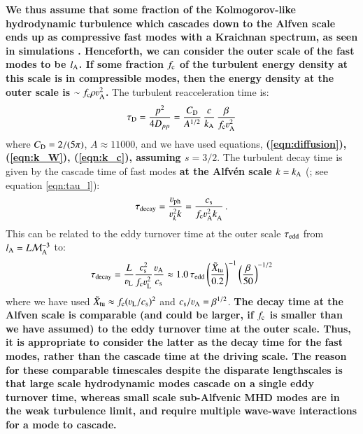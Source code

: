 \documentclass[fleqn,usenatbib,useAMS]{mnras}
\newcommand\C[1]{{\bf #1}}
\begin{document}
\C{We thus assume that some fraction of the Kolmogorov-like hydrodynamic turbulence which cascades down to the Alfven scale ends up as compressive fast modes with a Kraichnan spectrum, as seen in simulations \citep{cho03}. Henceforth, we can consider the outer scale of the fast modes to be $l_{\rm A}$. If some fraction $f_{\rm c}$ of the turbulent energy density at this scale is in compressible modes, then the energy density at the outer scale is $\sim f_{\rm c} \rho \varv_{\rm A}^{2}$.}
The turbulent reacceleration time is: 
\C{
  \begin{equation}
\tau_{\rm D} = \frac{p^{2}}{4 D_{pp}} = \frac{C_{\rm D}}{A^{1/2}}\, \frac{c}{k_{\rm A}}\, \frac{\beta}{f_{\rm c} \varv_{\rm A}^{2}}
\label{eqn:tau_D} 
\end{equation}
}
where $C_{\rm D} = 2/(5 \pi)$, $A\approx 11000$, and we have used equations, \C{(\ref{eqn:diffusion}), (\ref{eqn:k_W}), (\ref{eqn:k_c}), assuming $s=3/2$}. The turbulent decay time is given by the cascade time of fast modes \C{at the Alfv\'en scale $k=k_{{\mathrm{A}}}$} (\citealt{2004ApJ...614..757Y}; see equation \ref{eqn:tau_l}): 
\begin{equation}
  \tau_{\rm decay} = \frac{\varv_{\rm ph}}{\varv_k^{2} k} = 
\frac{c_{\rm s}}{f_{\rm c} \varv_{\rm A}^{2} k_{\rm A}^{}}\,.
\label{eqn:tau_decay} 
\end{equation}
This can be related to the eddy turnover time at the outer scale $\tau_{\rm edd}$ from $l_{\rm A} = L \mathcal{M}_{\rm A}^{-3}$ to: 
\begin{equation}
\tau_{\rm decay} =\frac{L}{\varv_{\rm L}} \frac{c_{\rm s}^{2}}{f_{\rm c} \varv_{\rm L}^{2}}  \frac{\varv_{\rm A}}{c_{\rm s}} \approx  1.0 \, \tau_{\rm edd} \left(\frac{\tilde{X}_{\rm tu}}{0.2}\right)^{-1}  \left(\frac{\beta}{50} \right)^{-1/2}
\end{equation}
where we have used $\tilde{X}_{\rm tu} \approx f_{\rm c} (\varv_{\rm L}/c_{\rm s})^{2}$ and $c_{\rm s}/\varv_{\rm A} = \beta^{1/2}$. \C{The decay time at the Alfven scale is comparable (and could be larger, if $f_{\rm c}$ is smaller than we have assumed) to the eddy turnover time at the outer scale. Thus, it is appropriate to consider the latter as the decay time for the fast modes, rather than the cascade time at the driving scale. The reason for these comparable timescales despite the disparate lengthscales is that large scale hydrodynamic modes cascade on a single eddy turnover time, whereas small scale sub-Alfvenic MHD modes are in the weak turbulence limit, and require multiple wave-wave interactions for a mode to cascade.  }
\end{document}
